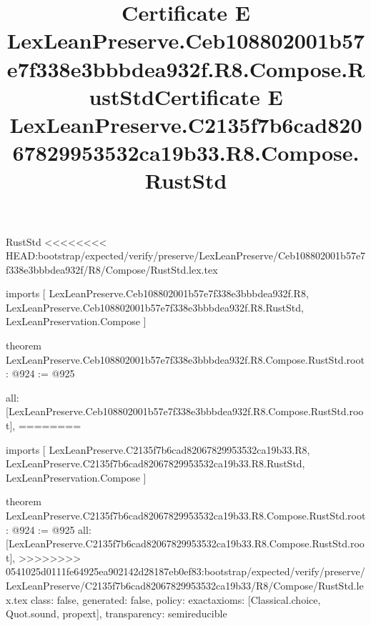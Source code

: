 \begin{lexlean}{RustStd}
<<<<<<<< HEAD:bootstrap/expected/verify/preserve/LexLeanPreserve/Ceb108802001b57e7f338e3bbbdea932f/R8/Compose/RustStd.lex.tex
\title{Certificate E LexLeanPreserve.Ceb108802001b57e7f338e3bbbdea932f.R8.Compose.RustStd}
\begin{coremodule}
imports [
  LexLeanPreserve.Ceb108802001b57e7f338e3bbbdea932f.R8,
  LexLeanPreserve.Ceb108802001b57e7f338e3bbbdea932f.R8.RustStd,
  LexLeanPreservation.Compose
]

theorem LexLeanPreserve.Ceb108802001b57e7f338e3bbbdea932f.R8.Compose.RustStd.root : @924 := @925 {
  all: [LexLeanPreserve.Ceb108802001b57e7f338e3bbbdea932f.R8.Compose.RustStd.root],
========
\title{Certificate E LexLeanPreserve.C2135f7b6cad82067829953532ca19b33.R8.Compose.RustStd}
\begin{coremodule}
imports [
  LexLeanPreserve.C2135f7b6cad82067829953532ca19b33.R8,
  LexLeanPreserve.C2135f7b6cad82067829953532ca19b33.R8.RustStd,
  LexLeanPreservation.Compose
]

theorem LexLeanPreserve.C2135f7b6cad82067829953532ca19b33.R8.Compose.RustStd.root : @924 := @925 {
  all: [LexLeanPreserve.C2135f7b6cad82067829953532ca19b33.R8.Compose.RustStd.root],
>>>>>>>> 0541025d0111fe64925ea902142d28187eb0ef83:bootstrap/expected/verify/preserve/LexLeanPreserve/C2135f7b6cad82067829953532ca19b33/R8/Compose/RustStd.lex.tex
  class: false,
  generated: false,
  policy: exact{axioms: [Classical.choice, Quot.sound, propext]},
  transparency: semireducible
}


\end{coremodule}}
\end{coremodule}
\end{lexlean}
